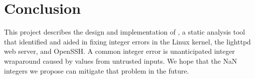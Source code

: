 \section{Conclusion}
\label{s:concl}

This project describes the design and implementation of \sys, a static analysis
tool that identified and aided in fixing \nrbugs integer errors in the Linux
kernel, the lighttpd web server, and OpenSSH\@.  A common integer error is
unanticipated integer wraparound caused by values from untrusted inputs.  We
hope that the NaN integers we propose can mitigate that problem in the future.
